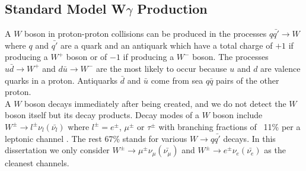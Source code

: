 \subsection{Standard Model W$\gamma$ Production}











A $W$ boson in proton-proton collisions can be produced in the processes $q {\bar{q'}} \rightarrow W$ where $q$ and $\bar{q'}$ are a quark and an antiquark which have a total charge of $+1$ if producing a $W^+$ boson or of $-1$ if producing a $W^-$ boson. The processes $u\bar{d}\rightarrow W^+$ and $d\bar{u}\rightarrow W^-$ are the most likely to occur because $u$ and $d$ are valence quarks in a proton. Antiquarks $\bar{d}$ and $\bar{u}$ come from sea $q\bar{q}$ pairs of the other proton.\\

A $W$ boson decays immediately after being created, and we do not detect the $W$ boson itself but its decay products. Decay modes of a $W$ boson include $W^\pm \rightarrow l^\pm \nu_l ({\bar{\nu_l}})$ where $l^\pm=e^\pm$, $\mu^\pm$ or $\tau^\pm$ with branching fractions of ~11\% per a leptonic channel \cite{ref_PDG}. The rest 67\% stands for various $W\rightarrow q\bar{q'}$ decays. In this dissertation we only consider $W^\pm \rightarrow \mu^\pm \nu_\mu ({\bar{\nu_\mu}})$ and $W^\pm \rightarrow e^\pm \nu_e ({\bar{\nu_e}})$ as the cleanest channels.\\

